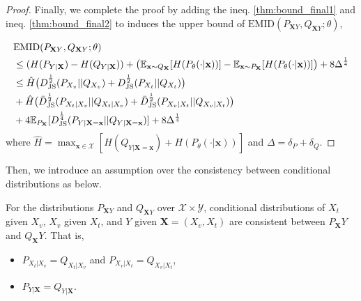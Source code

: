 \begin{proof}
Finally, we complete the proof by adding the ineq. \eqref{thm:bound_final1} and ineq. \eqref{thm:bound_final2} to induces the upper bound of $\text{EMID}(P_{\mathbf{X}Y},Q_{\mathbf{X}Y};\theta)$,

\begin{equation*}
    \begin{split}
        &\text{EMID}(P_{\mathbf{X}Y},Q_{\mathbf{X}Y};\theta) \\
        &\leq (H(P_{Y|\mathbf{X}}) - H(Q_{Y|\mathbf{X}})) + \big(\mathbb{E}_{\mathbf{x}\sim Q_{\mathbf{X}}}[H(P_{\theta}(\cdot|\mathbf{x}))] - \mathbb{E}_{\mathbf{x}\sim P_{\mathbf{X}}}[H(P_{\theta}(\cdot|\mathbf{x}))] \big) + 8\Delta^{\frac{1}{4}} \\
        &\leq \hat{H} \big( D^{\frac{1}{2}}_{\rm JS}(P_{X_{v}}||Q_{X_{v}})+D^{\frac{1}{2}}_{\rm JS}(P_{X_{t}}||Q_{X_{t}})\big) \\
        &+ \hat{H} \big( \bar{D}^{\frac{1}{2}}_{\rm JS}(P_{X_{t}|X_{v}}||Q_{X_{t}|X_{v}}) + \bar{D}^{\frac{1}{2}}_{\rm JS}(P_{X_{v}|X_{t}}||Q_{X_{v}|X_{t}}) \big) \\
        &+4\mathbb{E}_{P_{\mathbf{X}}}[D^{\frac{1}{4}}_{\rm JS}(P_{Y|\mathbf{X}=\mathbf{x}} || Q_{Y|\mathbf{X}=\mathbf{x}})]+8\Delta^{\frac{1}{4}}
    \end{split}
\end{equation*}
where $ \widehat{H}=\max_{\mathbf{x}\in\mathcal{X}} [H(Q_{Y|\mathbf{X}=\mathbf{x}})+H(P_{\theta}(\cdot|\mathbf{x}))]$ and $\Delta=\delta_{P}+\delta_{Q}$.
\end{proof}

Then, we introduce an assumption over the consistency between conditional distributions as below.
\begin{assumption}\label{assumption:consistent_cond_dist}
For the distributions $P_{\mathbf{X}Y}$ and $Q_{\mathbf{X}Y}$ over $\mathcal{X}\times \mathcal{Y}$, conditional distributions of $X_{t}$ given $X_{v}$, $X_{v}$ given $X_{t}$, and $Y$ given $\mathbf{X}=(X_{v},X_{t})$ are consistent between $P_{\mathbf{X}}Y$ and $Q_{\mathbf{X}}Y$. That is,
\begin{itemize}
    \item $P_{X_{t}|X_{v}}=Q_{X_{t}|X_{v}}$ and $P_{X_{v}|X_{t}}=Q_{X_{v}|X_{t}}$,
    \item $P_{Y|\mathbf{X}}=Q_{Y|\mathbf{X}}$.
\end{itemize}
\end{assumption}

